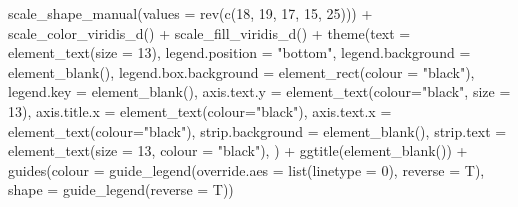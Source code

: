 \documentclass[
  letterpaper,
  DIV=11,
  numbers=noendperiod]{scrreprt}
\newenvironment{Shaded}{\begin{snugshade}}{\end{snugshade}}
\newcommand{\AttributeTok}[1]{\textcolor[rgb]{0.40,0.45,0.13}{#1}}
\newcommand{\DecValTok}[1]{\textcolor[rgb]{0.68,0.00,0.00}{#1}}
\newcommand{\FunctionTok}[1]{\textcolor[rgb]{0.28,0.35,0.67}{#1}}
\newcommand{\NormalTok}[1]{\textcolor[rgb]{0.00,0.23,0.31}{#1}}
\newcommand{\SpecialCharTok}[1]{\textcolor[rgb]{0.37,0.37,0.37}{#1}}
\newcommand{\StringTok}[1]{\textcolor[rgb]{0.13,0.47,0.30}{#1}}
\begin{document}
\begin{Shaded}
\begin{Highlighting}[]
  \FunctionTok{scale\_shape\_manual}\NormalTok{(}\AttributeTok{values =} \FunctionTok{rev}\NormalTok{(}\FunctionTok{c}\NormalTok{(}\DecValTok{18}\NormalTok{, }\DecValTok{19}\NormalTok{, }\DecValTok{17}\NormalTok{, }\DecValTok{15}\NormalTok{, }\DecValTok{25}\NormalTok{))) }\SpecialCharTok{+}
  \FunctionTok{scale\_color\_viridis\_d}\NormalTok{() }\SpecialCharTok{+}
  \FunctionTok{scale\_fill\_viridis\_d}\NormalTok{() }\SpecialCharTok{+}
  \FunctionTok{theme}\NormalTok{(}\AttributeTok{text =} \FunctionTok{element\_text}\NormalTok{(}\AttributeTok{size =} \DecValTok{13}\NormalTok{),}
                         \AttributeTok{legend.position =} \StringTok{"bottom"}\NormalTok{,}
                         \AttributeTok{legend.background =} \FunctionTok{element\_blank}\NormalTok{(),}
                         \AttributeTok{legend.box.background =} \FunctionTok{element\_rect}\NormalTok{(}\AttributeTok{colour =} \StringTok{"black"}\NormalTok{),}
                         \AttributeTok{legend.key =} \FunctionTok{element\_blank}\NormalTok{(),}
                         \AttributeTok{axis.text.y =} \FunctionTok{element\_text}\NormalTok{(}\AttributeTok{colour=}\StringTok{"black"}\NormalTok{, }\AttributeTok{size =} \DecValTok{13}\NormalTok{),}
                         \AttributeTok{axis.title.x =} \FunctionTok{element\_text}\NormalTok{(}\AttributeTok{colour=}\StringTok{"black"}\NormalTok{),}
                         \AttributeTok{axis.text.x =} \FunctionTok{element\_text}\NormalTok{(}\AttributeTok{colour=}\StringTok{"black"}\NormalTok{),}
                         \AttributeTok{strip.background =} \FunctionTok{element\_blank}\NormalTok{(),}
                         \AttributeTok{strip.text =} \FunctionTok{element\_text}\NormalTok{(}\AttributeTok{size =} \DecValTok{13}\NormalTok{, }\AttributeTok{colour =} \StringTok{"black"}\NormalTok{),}
\NormalTok{) }\SpecialCharTok{+}
  \FunctionTok{ggtitle}\NormalTok{(}\FunctionTok{element\_blank}\NormalTok{()) }\SpecialCharTok{+}
  \FunctionTok{guides}\NormalTok{(}\AttributeTok{colour =} \FunctionTok{guide\_legend}\NormalTok{(}\AttributeTok{override.aes =} \FunctionTok{list}\NormalTok{(}\AttributeTok{linetype =} \DecValTok{0}\NormalTok{), }\AttributeTok{reverse =}\NormalTok{ T),}
                          \AttributeTok{shape =} \FunctionTok{guide\_legend}\NormalTok{(}\AttributeTok{reverse =}\NormalTok{ T))}
\end{Highlighting}
\end{Shaded}
\end{document}
